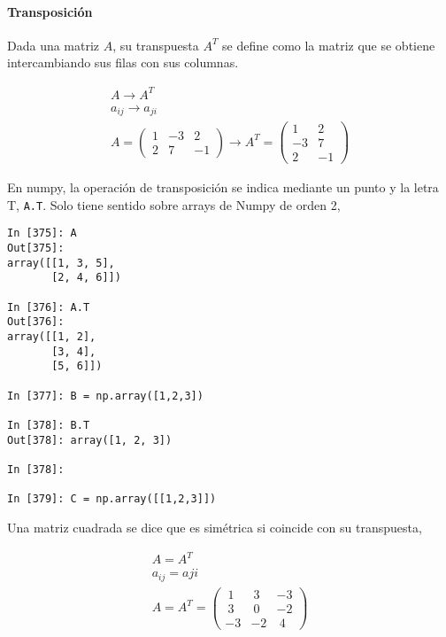 \begin{paracol}{2}
\paragraph{Transposición}
Dada una matriz $A$, su transpuesta $A^T$ se define como la matriz que se obtiene intercambiando sus filas con sus columnas.     
\end{paracol}


\begin{gather*}
A \rightarrow  A^T\\
a_{ij} \rightarrow  a_{ji}\\
A=
\begin{pmatrix}
1& -3& 2 \\
2& 7& -1
\end{pmatrix}  \rightarrow 
A^T=
\begin{pmatrix}
1& 2 \\
-3& 7\\
2 & -1
\end{pmatrix}
\end{gather*}

\begin{paracol}{2}
En numpy, la operación de transposición se indica mediante un punto y la letra T, \texttt{A.T}. Solo tiene sentido sobre arrays de Numpy de orden 2,  
\end{paracol}

\begin{center}
    \begin{minipage}{0.5\textwidth}
        \begin{verbatim}
In [375]: A
Out[375]: 
array([[1, 3, 5],
       [2, 4, 6]])

In [376]: A.T
Out[376]: 
array([[1, 2],
       [3, 4],
       [5, 6]])

In [377]: B = np.array([1,2,3]) 

In [378]: B.T
Out[378]: array([1, 2, 3])

In [378]: 

In [379]: C = np.array([[1,2,3]])
        \end{verbatim}
    \end{minipage}
\end{center}

\begin{paracol}{2}
Una matriz cuadrada se dice que es simétrica si coincide con su transpuesta,
\end{paracol}

\begin{gather*}
A=A^T\\
a_{ij}=a{ji}\\
A=A^T=
\begin{pmatrix}
\ 1&\ 3&-3\\
\ 3&\ 0&-2\\
-3&-2&\ 4
\end{pmatrix}
\end{gather*}

